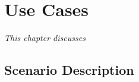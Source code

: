 \chapter{Use Cases}
\label{chap:usecases}
\textit{This chapter discusses }
\vspace{2ex}\vfill
\minitoc
\newpage

\section{Scenario Description}

